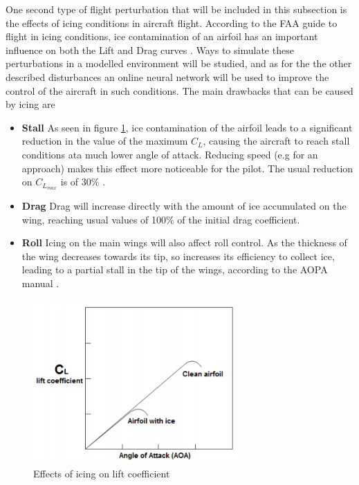 One second type of flight perturbation that will be included in this subsection is the effects of icing conditions in aircraft flight. According to the FAA guide to flight in icing conditions, ice contamination of an airfoil has an important influence on both the Lift and Drag curves \cite{icing_cond}. Ways to simulate these perturbations in a modelled environment will be studied, and as for the the other described disturbances an online neural network will be used to improve the control of the aircraft in such conditions. The main drawbacks that can be caused by icing are

\begin{itemize}
\item \textbf{Stall }As seen in figure \ref{fig:icing_lift}, ice contamination of the airfoil leads to a significant reduction in the value of the maximum $C_L$, causing the aircraft to reach stall conditions ata much lower angle of attack. Reducing speed (e.g for an approach) makes this effect more noticeable for the pilot. The usual reduction on $C_{L_{max}}$ is of 30\% \cite{icing_cond}.

\item \textbf{Drag }Drag will increase directly with the amount of ice accumulated on the wing, reaching usual values of 100\% of the initial drag coefficient.

\item \textbf{Roll }Icing on the main wings will also affect roll control. As the thickness of the wing decreases towards its tip, so increases its efficiency to collect ice, leading to a partial stall in the tip of the wings, according to the AOPA manual \cite{icing_aopa}.
\end{itemize}
\begin{figure}[H]
\centering
\includegraphics[width=0.7\textwidth]{Figures/Results/icing_lift.PNG}
\caption[Effects of icing on lift coefficient]{Effects of icing on lift coefficient \cite{icing_cond}}
\label{fig:icing_lift}
\end{figure}
